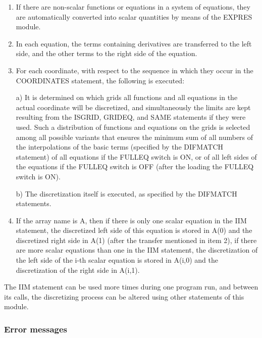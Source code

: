 \begin{enumerate}
  \item If there are  non-scalar functions  or equations  in a  system of
  equations, they  are automatically  converted into scalar quantities
  by means of the EXPRES module.

  \item  In   each  equation,   the  terms   containing  derivatives  are
  transferred to  the left side, and the other terms to the right side
  of the equation.

  \item For each coordinate, with respect to the  sequence in  which they
  occur in the COORDINATES statement, the following is executed:

  a) It  is determined  on which grids all functions and all equations
  in the actual coordinate will be discretized, and simultaneously the
  limits  are  kept  resulting  from  the  ISGRID,  GRIDEQ,  and  SAME
  statements if they were used. Such  a distribution  of functions and
  equations on  the grids is selected among all possible variants that
  ensures the minimum sum of all numbers of the interpolations  of the
  basic terms  (specified by  the DIFMATCH statement) of all equations
  if the FULLEQ switch is ON, or of all left sides of the equations if
  the FULLEQ  switch is  OFF (after  the loading  the FULLEQ switch is
  ON).

  b) The  discretization  itself  is  executed,  as  specified  by the
  DIFMATCH statements.

  \item If the array name is A, then if there is only one scalar equation
  in the IIM statement, the discretized left side of this  equation is
  stored in  A(0) and  the discretized  right side  in A(1) (after the
  transfer mentioned in item  2), if  there are  more scalar equations
  than one  in the  IIM statement, the discretization of the left side
  of  the  i-th  scalar   equation  is   stored  in   A(i,0)  and  the
  discretization of the right side in A(i,1).
\end{enumerate}
The IIM  statement can  be used  more times  during one program run, and
between its calls, the discretizing process  can be  altered using other
statements of this module.


\subsubsection{Error messages}



